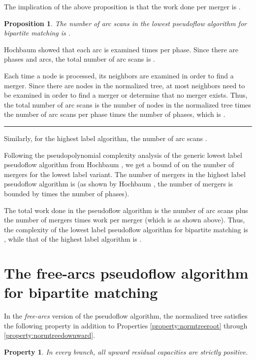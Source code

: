 \documentclass{article}
\newtheorem{proposition}{Proposition}[section]
\newtheorem{property}{Property}[section]
\newenvironment{proof}[1][Proof:]{\begin{trivlist}
\item[\hskip \labelsep {\bfseries #1}]}{\end{trivlist}}
\newcommand{\qed}{\hfill \rule{2.5mm}{2.5mm}}
\begin{document}
The implication of the above proposition is that the work done per merger is .

\begin{proposition}
The number of arc scans in the lowest pseudoflow algorithm for bipartite matching is .
\end{proposition}
\begin{proof}
Hochbaum \cite{Hoc97, Hoc07} showed that each arc is examined  times per phase.  Since there are  phases and  arcs, the total number of arc scans is .

Each time a node is processed, its neighbors are examined in order to find a merger.  Since there are  nodes in the normalized tree, at most  neighbors need to be examined in order to find a merger or determine that no merger exists.  Thus, the total number of arc scans is the number of nodes in the normalized tree times the number of arc scans per phase times the number of phases, which is . \qed
\end{proof}

Similarly, for the highest label algorithm, the number of arc scans .

Following the pseudopolynomial complexity analysis of the generic lowest label pseudoflow algorithm from Hochbaum \cite{Hoc97, Hoc07}, we get a bound of  on the number of mergers for the lowest label variant.  The number of mergers in the highest label pseudoflow algorithm is  (as shown by Hochbaum \cite{Hoc97, Hoc07}, the number of mergers is bounded by  times the number of phases).

The total work done in the pseudoflow algorithm is the number of arc scans plus the number of mergers times work per merger (which is  as shown above).  Thus, the complexity of the lowest label pseudoflow algorithm for bipartite matching is \mbox{}, while that of the highest label algorithm is .

\section{The free-arcs pseudoflow algorithm for bipartite matching}

In the {\em free-arcs} version of the pseudoflow algorithm, the normalized tree satisfies the following property in addition to Properties \ref{property:normtreeroot} through \ref{property:normtreedownward}.

\begin{property}
\label{property:normtreeupward}
In every branch, all upward residual capacities are strictly positive.
\end{property}
\end{document}

